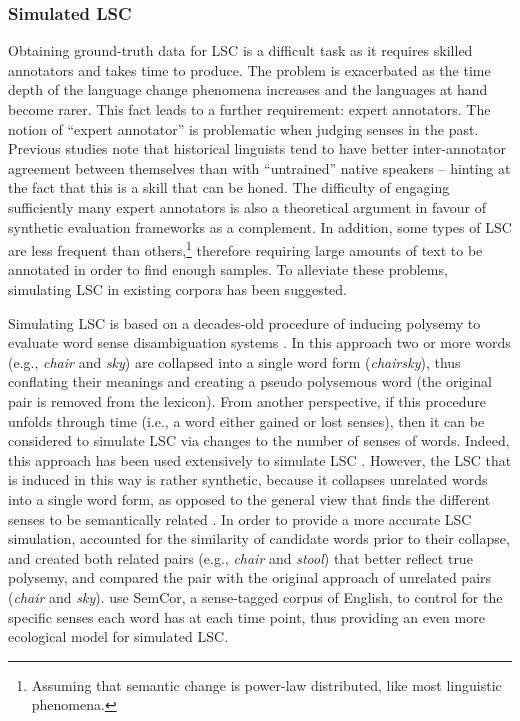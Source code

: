 \documentclass[output=paper]{langscibook}
\begin{document}
	
\subsubsection{Simulated LSC} 

Obtaining ground-truth data for LSC is a difficult task as it requires skilled annotators and takes time to produce. 
The problem is exacerbated as the time depth of the language change phenomena increases and the languages at hand become rarer. This fact leads to a further requirement: expert annotators. The notion of ``expert annotator'' is problematic when judging senses in the past. Previous studies \citep[e.g.][]{schlechtweg2018durel} note that historical linguists tend to have better inter-annotator agreement between themselves than with ``untrained'' native speakers -- hinting at the fact that this is a skill that can be honed. The difficulty of engaging sufficiently many expert annotators is also a theoretical argument in favour of synthetic evaluation frameworks as a complement.
In addition, some types of LSC are less frequent than others,\footnote{Assuming that semantic change is power-law distributed, like most linguistic phenomena.} 
therefore requiring large amounts of text to be annotated in order to find enough samples. To alleviate these problems, simulating LSC in existing corpora has been suggested.
 
 Simulating LSC is based on a decades-old procedure of inducing polysemy to evaluate word sense disambiguation systems \citep{gale1992, schutze1998}. 
 In this approach two or more words (e.g., \emph{chair} and \emph{sky}) are collapsed into a single word form (\emph{chairsky}), thus conflating their meanings and creating a pseudo polysemous word (the original pair is removed from the lexicon). 
 From another perspective, if this procedure unfolds through time (i.e., a word either gained or lost senses), then it can be considered to simulate LSC via changes to the number of senses of words. 
 Indeed, this approach has been used extensively to simulate LSC \citep{cook10, kulkarni2015statistically, rosenfeld-erk-2018-deep, shoemark-etal-2019-room}. 
 However, the LSC that is induced in this way is rather synthetic, because it collapses unrelated words into a single word form, as opposed to the general view that finds the different senses to be semantically related \citep{fillmore2000describing}. 
 In order to provide a more accurate LSC simulation, \citet{dubossarsky-etal-2019-time} accounted for the similarity of candidate words prior to their collapse, and created both related pairs (e.g., \emph{chair} and \emph{stool}) that better reflect true polysemy, and compared the pair with the original approach of unrelated pairs (\emph{chair} and \emph{sky}). \citet{schlechtwegwalde20} use SemCor, a sense-tagged corpus of English, to control for the specific senses each word has at each time point, thus providing an even more ecological model for simulated LSC.
 
\end{document}
